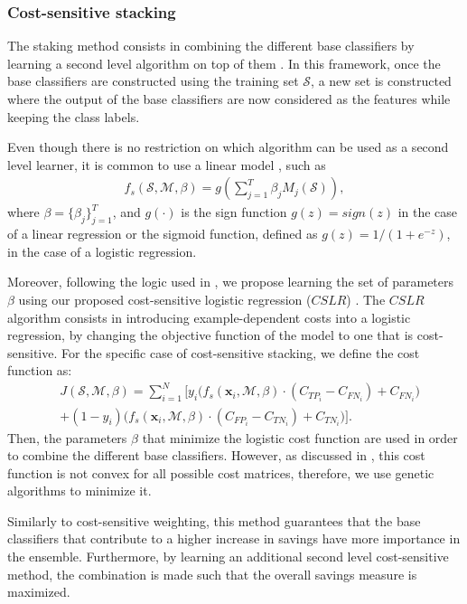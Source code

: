 {\subsubsection{Cost-sensitive stacking}
\label{sec:9:staking}

The staking method consists in combining the different base classifiers by learning a 
second level algorithm on top of them \citep{Wolpert1992}. In this framework, once the base 
classifiers are constructed using the training set  $\mathcal{S}$, a new set is constructed 
where the output of the base classifiers  are now considered as the features while keeping the 
class labels.

Even though there is no restriction on which algorithm can be used as a second level learner, 
it is common to use a linear model \citep{Zhou2012}, such as 
\begin{align}
  f_s(\mathcal{S},\mathcal{M},\beta) =
  g \left( \sum_{j=1}^T \beta_j M_j(\mathcal{S}) \right),
\end{align}
where $\beta=\{\beta_j\}_{j=1}^T$, and $g(\cdot)$ is the sign function 
\mbox{$g(z)=sign(z)$} in the case of a linear regression or the sigmoid function, defined 
as \mbox{$g(z)=1/(1+e^{-z})$}, in the case of a logistic regression. 

Moreover, following the logic used in \citep{Nesbitt2010}, we propose learning the set of  
parameters $\beta$  using our proposed cost-sensitive logistic regression ($CSLR$) 
\citep{CorreaBahnsen2014b}. The $CSLR$ algorithm consists in introducing example-dependent costs 
into a logistic regression, by changing the objective function of the model to one that is 
cost-sensitive. For the specific case of cost-sensitive stacking, we define the cost function as: 
\begin{align}
  &J(\mathcal{S},\mathcal{M},\beta)= 
  \sum_{i=1}^{N} \bigg[ y_i\bigg( 
  f_s(\mathbf{x}_i,\mathcal{M},\beta) \cdot(C_{TP_i} - C_{FN_i}) + C_{FN_i} \bigg) 
  \nonumber \\
  & + (1-y_i)\bigg( f_s(\mathbf{x}_i,\mathcal{M},\beta) \cdot(C_{FP_i} - C_{TN_i}) 
    +C_{TN_i} \bigg) \bigg].
\end{align}
Then, the parameters $\beta$ that minimize the logistic cost function are used in order to 
combine the different base classifiers. However, as discussed in \citep{CorreaBahnsen2014b}, 
this cost function is not convex for all possible cost matrices, therefore, we use genetic 
algorithms to minimize it.

Similarly to cost-sensitive weighting, this method guarantees that the base classifiers that 
contribute to a higher increase in savings have more importance in the ensemble. Furthermore, 
by learning an additional second level cost-sensitive method, the combination is made such that 
the overall   savings measure is maximized.


}
